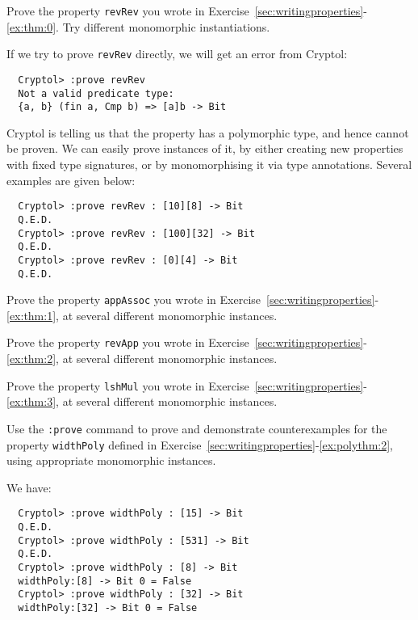 \begin{Exercise}\label{ex:prove:1}
  Prove the property {\tt revRev} you wrote in
  Exercise~\ref{sec:writingproperties}-\ref{ex:thm:0}. Try different
  monomorphic instantiations.
\end{Exercise}
\begin{Answer}
  If we try to prove {\tt revRev} directly, we will get an error from
  Cryptol:
\begin{Verbatim}
  Cryptol> :prove revRev
  Not a valid predicate type:
  {a, b} (fin a, Cmp b) => [a]b -> Bit
\end{Verbatim}
Cryptol is telling us that the property has a polymorphic type, and
hence cannot be proven. We can easily prove instances of it, by either
creating new properties with fixed type signatures\indSignature, or by
monomorphising it via type annotations\indTypeAnnotation. Several
examples are given below:
\begin{Verbatim}
  Cryptol> :prove revRev : [10][8] -> Bit
  Q.E.D.
  Cryptol> :prove revRev : [100][32] -> Bit
  Q.E.D.
  Cryptol> :prove revRev : [0][4] -> Bit
  Q.E.D.
\end{Verbatim}
\end{Answer}

\begin{Exercise}\label{ex:prove:2}
  Prove the property {\tt appAssoc} you wrote in
  Exercise~\ref{sec:writingproperties}-\ref{ex:thm:1}, at several
  different monomorphic instances.
\end{Exercise}

\begin{Exercise}\label{ex:prove:3}
  Prove the property {\tt revApp} you wrote in
  Exercise~\ref{sec:writingproperties}-\ref{ex:thm:2}, at several
  different monomorphic instances.
\end{Exercise}

\begin{Exercise}\label{ex:prove:4}
  Prove the property {\tt lshMul} you wrote in
  Exercise~\ref{sec:writingproperties}-\ref{ex:thm:3}, at several
  different monomorphic instances.
\end{Exercise}

\begin{Exercise}\label{ex:prove:5}
  Use the {\tt :prove} command to prove and demonstrate
  counterexamples for the property {\tt widthPoly} defined in
  Exercise~\ref{sec:writingproperties}-\ref{ex:polythm:2}, using
  appropriate monomorphic instances.
\end{Exercise}
\begin{Answer}
We have:
\begin{Verbatim}
  Cryptol> :prove widthPoly : [15] -> Bit
  Q.E.D.
  Cryptol> :prove widthPoly : [531] -> Bit
  Q.E.D.
  Cryptol> :prove widthPoly : [8] -> Bit
  widthPoly:[8] -> Bit 0 = False
  Cryptol> :prove widthPoly : [32] -> Bit
  widthPoly:[32] -> Bit 0 = False
\end{Verbatim}
\end{Answer}


